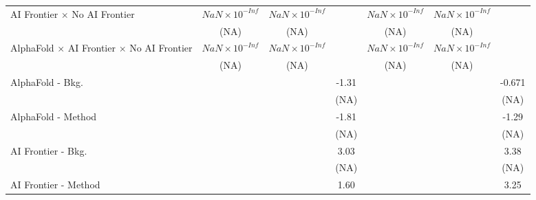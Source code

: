 \begin{tabular}{lcccccc}
   AI Frontier $\times$ No AI Frontier                                        & $NaN\times 10^{-Inf}$  & $NaN\times 10^{-Inf}$  &                        & $NaN\times 10^{-Inf}$  & $NaN\times 10^{-Inf}$  &   \\   
                                                                              & (NA)                   & (NA)                   &                        & (NA)                   & (NA)                   &   \\   
   AlphaFold $\times$ AI Frontier $\times$ No AI Frontier                     & $NaN\times 10^{-Inf}$  & $NaN\times 10^{-Inf}$  &                        & $NaN\times 10^{-Inf}$  & $NaN\times 10^{-Inf}$  &   \\   
                                                                              & (NA)                   & (NA)                   &                        & (NA)                   & (NA)                   &   \\   
   AlphaFold - Bkg.                                                           &                        &                        & -1.31                  &                        &                        & -0.671\\   
                                                                              &                        &                        & (NA)                   &                        &                        & (NA)\\   
   AlphaFold - Method                                                         &                        &                        & -1.81                  &                        &                        & -1.29\\   
                                                                              &                        &                        & (NA)                   &                        &                        & (NA)\\   
   AI Frontier - Bkg.                                                         &                        &                        & 3.03                   &                        &                        & 3.38\\   
                                                                              &                        &                        & (NA)                   &                        &                        & (NA)\\   
   AI Frontier - Method                                                       &                        &                        & 1.60                   &                        &                        & 3.25\\   

\end{tabular}
